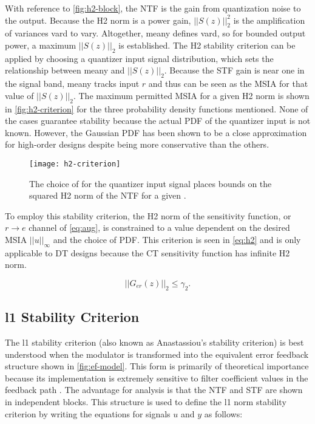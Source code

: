 With reference to \autoref{fig:h2-block}, the \gls{NTF} is the gain from quantization noise to the output. Because the \gls{H2} norm is a power gain, $||S(z)||_2^2$ is the amplification of variances \gls{vard} to \gls{vary}. Altogether, \gls{meany} defines \gls{vard}, so for bounded output power, a maximum $||S(z)||_2$ is established. The \gls{H2} stability criterion can be applied by choosing a quantizer input signal distribution, which sets the relationship between \gls{meany} and $||S(z)||_2$. Because the \gls{STF} gain is near one in the signal band, \gls{meany} tracks input $r$ and thus can be seen as the \gls{MSIA} for that value of $||S(z)||_2$. The maximum permitted \gls{MSIA} for a given \gls{H2} norm is shown in \autoref{fig:h2-criterion} for the three probability density functions mentioned. None of the cases guarantee stability because the actual \gls{PDF} of the quantizer input is not known. However, the Gaussian \gls{PDF} has been shown to be a close approximation for high-order designs \cite{Risbo1994} despite being more conservative than the others. 

\begin{figure}
	\centering
	\texttt{[image: h2-criterion]}
	\caption{The choice of  for the quantizer input signal places bounds on the squared \gls{H2} norm of the \gls{NTF} for a given  \cite{Risbo1994}.} \label{fig:h2-criterion}
\end{figure}

To employ this stability criterion, the \gls{H2} norm of the sensitivity function, or $r \rightarrow e$ channel of \autoref{eq:aug}, is constrained to a value dependent on the desired \gls{MSIA} $||u||_\infty$ and the choice of \gls{PDF}. This criterion is seen in \autoref{eq:h2} and is only applicable to \gls{DT} designs because the \gls{CT} sensitivity function has infinite \gls{H2} norm.

\begin{equation}
	||G_{er}(z)||_2 \leq \gamma_2. \label{eq:h2}
\end{equation}
 
 \subsection{\gls{l1} Stability Criterion}
 \label{sec:stab-l1}
 
The \gls{l1} stability criterion (also known as Anastassiou's stability criterion) is best understood when the modulator is transformed into the equivalent error feedback structure shown in \autoref{fig:ef-model}. This form is primarily of theoretical importance because its implementation is extremely sensitive to filter coefficient values in the feedback path \cite{Schreier1997}. The advantage for analysis is that the \gls{NTF} and \gls{STF} are shown in independent blocks. This structure is used to define the \gls{l1} norm stability criterion by writing the equations for signals $u$ and $y$ as follows:
 
